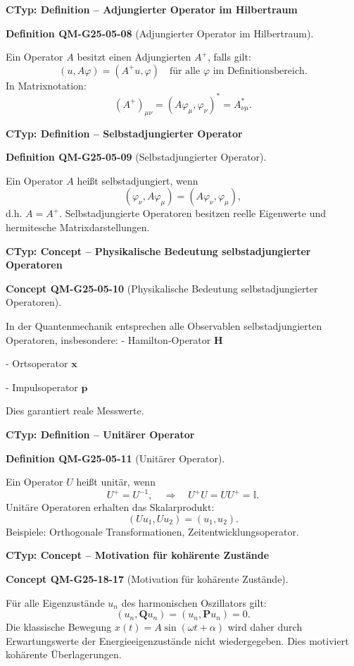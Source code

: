 \documentclass[10pt, letterpaper]{article}
\newcommand{\CustomHeading}[3]{%
  \par\medskip\noindent%
  \textbf{#1 #2} \textnormal{(#3)}.\enskip%
}
\newenvironment{DEF}[2]{\begin{unitbox}\CustomHeading{Definition}{#1}{#2}}{\end{unitbox}}
\newenvironment{CONC}[2]{\begin{unitbox}\CustomHeading{Concept}{#1}{#2}}{\end{unitbox}}
\begin{document}
\textbf{CTyp: Definition – Adjungierter Operator im Hilbertraum}

\begin{DEF}{QM-G25-05-08}{Adjungierter Operator im Hilbertraum}
Ein Operator $A$ besitzt einen Adjungierten $A^+$, falls gilt:
\[
(u, A \varphi) = (A^+ u, \varphi) \quad \text{für alle } \varphi \text{ im Definitionsbereich}.
\]
In Matrixnotation:
\[
(A^+)_{\mu\nu} = (A \varphi_\mu, \varphi_\nu)^* = A^*_{\nu\mu}.
\]
\end{DEF}


\textbf{CTyp: Definition – Selbstadjungierter Operator}

\begin{DEF}{QM-G25-05-09}{Selbstadjungierter Operator}
Ein Operator $A$ heißt selbstadjungiert, wenn
\[
(\varphi_\nu, A \varphi_\mu) = (A \varphi_\nu, \varphi_\mu),
\]
d.h. $A = A^+$. Selbstadjungierte Operatoren besitzen reelle Eigenwerte und hermitesche Matrixdarstellungen.
\end{DEF}


\textbf{CTyp: Concept – Physikalische Bedeutung selbstadjungierter Operatoren}

\begin{CONC}{QM-G25-05-10}{Physikalische Bedeutung selbstadjungierter Operatoren}
In der Quantenmechanik entsprechen alle Observablen selbstadjungierten Operatoren, insbesondere:
- Hamilton-Operator $\mathbf{H}$

- Ortsoperator $\mathbf{x}$

- Impulsoperator $\mathbf{p}$

Dies garantiert reale Messwerte.
\end{CONC}


\textbf{CTyp: Definition – Unitärer Operator}

\begin{DEF}{QM-G25-05-11}{Unitärer Operator}
Ein Operator $U$ heißt unitär, wenn
\[
U^+ = U^{-1}, \quad \Rightarrow \quad U^+ U = UU^+ = \mathbb{I}.
\]
Unitäre Operatoren erhalten das Skalarprodukt:
\[
(U u_1, U u_2) = (u_1, u_2).
\]
Beispiele: Orthogonale Transformationen, Zeitentwicklungsoperator.
\end{DEF}



\textbf{CTyp: Concept – Motivation für kohärente Zustände}

\begin{CONC}{QM-G25-18-17}{Motivation für kohärente Zustände}
Für alle Eigenzustände $u_n$ des harmonischen Oszillators gilt:
\[
(u_n, \mathbf{Q} u_n) = (u_n, \mathbf{P} u_n) = 0.
\]
Die klassische Bewegung $x(t) = A\sin(\omega t + \alpha)$ wird daher durch Erwartungswerte der Energieeigenzustände nicht wiedergegeben. Dies motiviert kohärente Überlagerungen.
\end{CONC}
\end{document}

